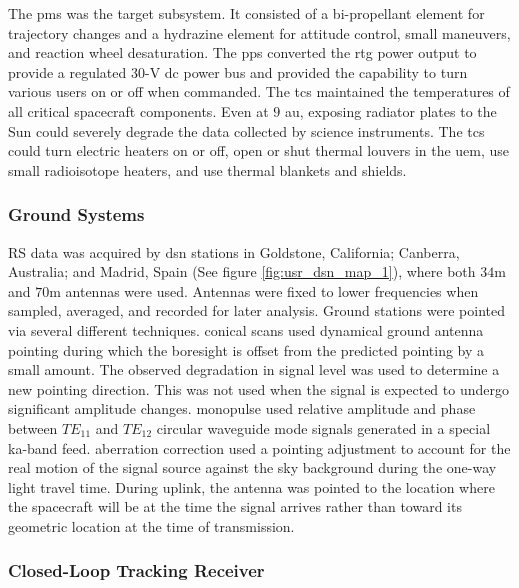 \documentclass{article}
\theoremstyle{mystyle}
\begin{document}
The \gls{pms} was the target subsystem. It consisted of a bi-propellant element for trajectory changes and a \gls{hydrazine} element for attitude control, small maneuvers, and reaction wheel desaturation. The \gls{pps} converted the \gls{rtg} power output to provide a regulated 30-V \gls{dc} power bus and provided the capability to turn various users on or off when commanded. The \gls{tcs} maintained the temperatures of all critical spacecraft components. Even at $9$ \gls{au}, exposing radiator plates to the Sun could severely degrade the data collected by science instruments. The \gls{tcs} could turn electric heaters on or off, open or shut thermal louvers in the \gls{uem}, use small radioisotope heaters, and use thermal blankets and shields.

\subsubsection{\footnotesize Ground Systems \label{subsubsec:usr_ground_sys}}

RS data was acquired by \gls{dsn} stations in Goldstone, California; Canberra, Australia; and Madrid, Spain (See figure \ref{fig:usr_dsn_map_1}), where both $34$m and $70$m antennas were used. Antennas were fixed to lower frequencies when sampled, averaged, and recorded for later analysis. Ground stations were pointed via several different techniques. \Glspl{conical scan} used dynamical ground antenna pointing during which the boresight is offset from the predicted pointing by a small amount. The observed degradation in signal level was used to determine a new pointing direction. This was not used when the signal is expected to undergo significant amplitude changes. \Gls{monopulse} used relative amplitude and phase between $TE_{11}$ and $TE_{12}$ circular \gls{waveguide} mode signals generated in a special \gls{ka-band} feed. \Gls{aberration correction} used a pointing adjustment to account for the real motion of the signal source against the sky background during the one-way light travel time. During \gls{uplink}, the antenna was pointed to the location where the spacecraft will be at the time the signal arrives rather than toward its geometric location at the time of transmission.

\subsubsection{\footnotesize Closed-Loop Tracking Receiver \label{subsubsec:usr_closed_loop_track_rec}}
\end{document}
